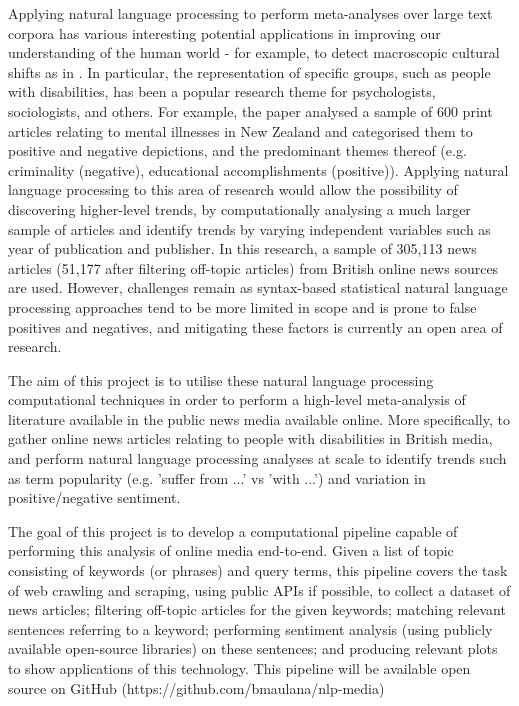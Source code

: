 \documentclass{report}
\begin{document}
Applying natural language processing to perform meta-analyses over large text corpora has various interesting potential applications in improving our understanding of the human world - for example, to detect macroscopic cultural shifts as in \cite{lansdall2017content}.
In particular, the representation of specific groups, such as people with disabilities, has been a popular research theme for psychologists, sociologists, and others.
For example, the paper \cite{coverdale2002depictions} analysed a sample of 600 print articles relating to mental illnesses in New Zealand and categorised them to positive and negative depictions, and the predominant themes thereof (e.g. criminality (negative), educational accomplishments (positive)).
Applying natural language processing to this area of research would allow the possibility of discovering higher-level trends, by computationally analysing a much larger sample of articles and identify trends by varying independent variables such as year of publication and publisher.
In this research, a sample of 305,113 news articles (51,177 after filtering off-topic articles) from British online news sources are used.
However, challenges remain as syntax-based statistical natural language processing approaches tend to be more limited in scope and is prone to false positives and negatives, and mitigating these factors is currently an open area of research.

The aim of this project is to utilise these natural language processing computational techniques in order to perform a high-level meta-analysis of literature available in the public news media available online.
More specifically, to gather online news articles relating to people with disabilities in British media, and perform natural language processing analyses at scale to identify trends such as term popularity (e.g. 'suffer from ...' vs 'with ...') and variation in positive/negative sentiment.

The goal of this project is to develop a computational pipeline capable of performing this analysis of online media end-to-end.
Given a list of topic consisting of keywords (or phrases) and query terms, this pipeline covers the task of web crawling and scraping, using public APIs if possible, to collect a dataset of news articles; filtering off-topic articles for the given keywords; matching relevant sentences referring to a keyword; performing sentiment analysis (using publicly available open-source libraries) on these sentences; and producing relevant plots to show applications of this technology.
This pipeline will be available open source on GitHub (https://github.com/bmaulana/nlp-media)  %
\end{document}
